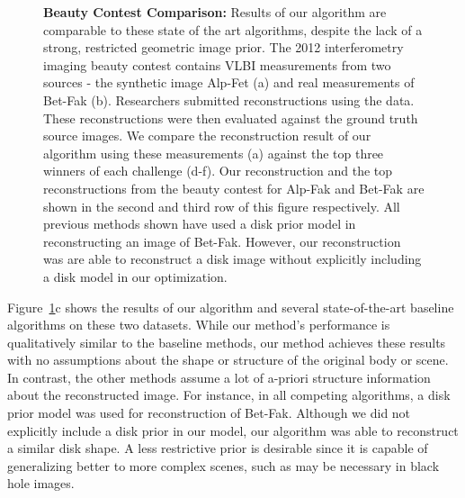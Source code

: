 \begin{figure}[h!]
                    \caption{{\bf Beauty Contest Comparison:} Results of our algorithm are comparable to these state of the art algorithms, despite the lack of a strong, restricted geometric image prior. The 2012 interferometry imaging beauty contest contains VLBI measurements from two sources - the synthetic image Alp-Fet (a) and real measurements of Bet-Fak (b). Researchers submitted reconstructions using the data. These reconstructions were then evaluated against the ground truth source images. We compare the reconstruction result of our algorithm using these measurements (a) against the top three winners of each challenge (d-f). Our reconstruction and the top reconstructions from the beauty contest for Alp-Fak and Bet-Fak are shown in the second and third row of this figure respectively.  All previous methods shown have used a disk prior model in reconstructing an image of Bet-Fak. However, our reconstruction was are able to reconstruct a disk image without explicitly including a disk model in our optimization.}
 \label{fig:beauty}
\end{figure}

Figure~\ref{fig:beauty}c shows the results of our algorithm and several state-of-the-art baseline algorithms on these two datasets. While our method's performance is qualitatively similar to the baseline methods, our method achieves these results with no assumptions about the shape or structure of the original body or scene. In contrast, the other methods assume a lot of a-priori structure information about the reconstructed image. For instance, in all competing algorithms, a disk prior model was used for reconstruction of Bet-Fak. Although we did not explicitly include a disk prior in our model, our algorithm was able to reconstruct a similar disk shape. A less restrictive prior is desirable since it is capable of generalizing better to more complex scenes, such as may be necessary in black hole images. 



